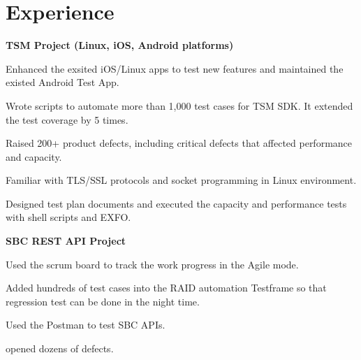 \documentclass[a4paper]{lyu-resume} %
\begin{document}
\begin{minipage}[t]{0.66\textwidth} %
\section{Experience}
\textbf{TSM Project (Linux, iOS, Android platforms)}
\vspace{\topsep} %
\begin{tightitemize}
\item Enhanced the exsited iOS/Linux apps to test new features and maintained the existed Android Test App.
\item Wrote scripts to automate more than 1,000 test cases for TSM SDK. It extended the test coverage by 5 times. 
\item Raised 200+ product defects, including critical defects that affected performance and capacity.
\item Familiar with TLS/SSL protocols and socket programming in Linux environment.
\item Designed test plan documents and executed the capacity and performance tests with shell scripts and EXFO.
\end{tightitemize}

\vspace{\topsep} %
\textbf{SBC REST API Project}
\begin{tightitemize}
\item Used the scrum board to track the work progress in the Agile mode.
\item Added hundreds of test cases into the RAID automation Testframe so that regression test can be done in the night time.
\item Used the Postman to test SBC APIs.
\item opened dozens of defects.
\end{tightitemize}


\end{minipage}
\end{document}
